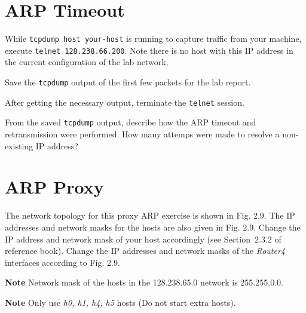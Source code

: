 \documentclass{../UTNetLab}
\begin{document}
\section{ARP Timeout}
    While \lstinline[emph={your-host}]{tcpdump host your-host} is running to capture traffic from your machine, execute \lstinline{telnet 128.238.66.200}.
    Note there is no host with this IP address in the current configuration of the lab network.

    Save the \lstinline{tcpdump} output of the first few packets for the lab report.

    After getting the necessary output, terminate the \lstinline{telnet} session.

    \begin{report}
    \item From the saved \lstinline{tcpdump} output, describe how the ARP timeout and retransmission were performed.
    How many attemps were made to resolve a non-existing IP address?
    \end{report}

\section{ARP Proxy}
    The network topology for this proxy ARP exercise is shown in Fig. 2.9. The IP addresses and network masks for the hosts are also given in Fig. 2.9. Change the IP address and network mask of your host accordingly (see Section~2.3.2 of reference book). Change the IP addresses and network masks of the \textit{Router4} interfaces according to Fig. 2.9.

    \textbf{Note}\quad
    Network mask of the hosts in the 128.238.65.0 network is 255.255.0.0.
    
    \textbf{Note}\quad
    Only use \textit{h0, h1, h4, h5} hosts (Do not start extra hosts).
\end{document}
